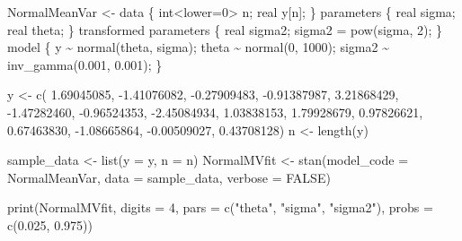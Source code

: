 \documentclass[
  10pt,
  spanish,
]{book}
\newenvironment{Shaded}{\begin{snugshade}}{\end{snugshade}}
\newcommand{\AttributeTok}[1]{\textcolor[rgb]{0.77,0.63,0.00}{#1}}
\newcommand{\ConstantTok}[1]{\textcolor[rgb]{0.00,0.00,0.00}{#1}}
\newcommand{\DecValTok}[1]{\textcolor[rgb]{0.00,0.00,0.81}{#1}}
\newcommand{\FloatTok}[1]{\textcolor[rgb]{0.00,0.00,0.81}{#1}}
\newcommand{\FunctionTok}[1]{\textcolor[rgb]{0.00,0.00,0.00}{#1}}
\newcommand{\NormalTok}[1]{#1}
\newcommand{\OtherTok}[1]{\textcolor[rgb]{0.56,0.35,0.01}{#1}}
\newcommand{\SpecialCharTok}[1]{\textcolor[rgb]{0.00,0.00,0.00}{#1}}
\newcommand{\StringTok}[1]{\textcolor[rgb]{0.31,0.60,0.02}{#1}}
\theoremstyle{definition}
\theoremstyle{definition}
\theoremstyle{definition}
\theoremstyle{definition}
\theoremstyle{remark}
\begin{document}
\begin{Shaded}
\begin{Highlighting}[]
\NormalTok{NormalMeanVar }\OtherTok{\textless{}{-}} \StringTok{\textquotesingle{}}
\StringTok{data \{}
\StringTok{  int\textless{}lower=0\textgreater{} n;}
\StringTok{  real y[n];}
\StringTok{\}}
\StringTok{parameters \{}
\StringTok{  real sigma;}
\StringTok{  real theta;}
\StringTok{\}}
\StringTok{transformed parameters \{}
\StringTok{  real sigma2;}
\StringTok{  sigma2 = pow(sigma, 2);}
\StringTok{\}}
\StringTok{model \{}
\StringTok{  y \textasciitilde{} normal(theta, sigma);}
\StringTok{  theta \textasciitilde{} normal(0, 1000);}
\StringTok{  sigma2 \textasciitilde{} inv\_gamma(0.001, 0.001);}
\StringTok{\}}
\StringTok{\textquotesingle{}}

\NormalTok{y }\OtherTok{\textless{}{-}} \FunctionTok{c}\NormalTok{( }\FloatTok{1.69045085}\NormalTok{, }\SpecialCharTok{{-}}\FloatTok{1.41076082}\NormalTok{, }\SpecialCharTok{{-}}\FloatTok{0.27909483}\NormalTok{, }
       \SpecialCharTok{{-}}\FloatTok{0.91387987}\NormalTok{,  }\FloatTok{3.21868429}\NormalTok{, }\SpecialCharTok{{-}}\FloatTok{1.47282460}\NormalTok{, }
       \SpecialCharTok{{-}}\FloatTok{0.96524353}\NormalTok{, }\SpecialCharTok{{-}}\FloatTok{2.45084934}\NormalTok{,  }\FloatTok{1.03838153}\NormalTok{, }
        \FloatTok{1.79928679}\NormalTok{,  }\FloatTok{0.97826621}\NormalTok{,  }\FloatTok{0.67463830}\NormalTok{, }
       \SpecialCharTok{{-}}\FloatTok{1.08665864}\NormalTok{, }\SpecialCharTok{{-}}\FloatTok{0.00509027}\NormalTok{,  }\FloatTok{0.43708128}\NormalTok{)}
\NormalTok{n }\OtherTok{\textless{}{-}} \FunctionTok{length}\NormalTok{(y)}

\NormalTok{sample\_data }\OtherTok{\textless{}{-}} \FunctionTok{list}\NormalTok{(}\AttributeTok{y =}\NormalTok{ y,}
                    \AttributeTok{n =}\NormalTok{ n)}
\NormalTok{NormalMVfit }\OtherTok{\textless{}{-}} \FunctionTok{stan}\NormalTok{(}\AttributeTok{model\_code =}\NormalTok{ NormalMeanVar,}
                   \AttributeTok{data =}\NormalTok{ sample\_data, }\AttributeTok{verbose =} \ConstantTok{FALSE}\NormalTok{)}
\end{Highlighting}
\end{Shaded}

\begin{Shaded}
\begin{Highlighting}[]
\FunctionTok{print}\NormalTok{(NormalMVfit, }\AttributeTok{digits =} \DecValTok{4}\NormalTok{, }
      \AttributeTok{pars =} \FunctionTok{c}\NormalTok{(}\StringTok{"theta"}\NormalTok{, }\StringTok{"sigma"}\NormalTok{, }\StringTok{"sigma2"}\NormalTok{), }\AttributeTok{probs =} \FunctionTok{c}\NormalTok{(}\FloatTok{0.025}\NormalTok{, }\FloatTok{0.975}\NormalTok{))}
\end{Highlighting}
\end{Shaded}
\end{document}
